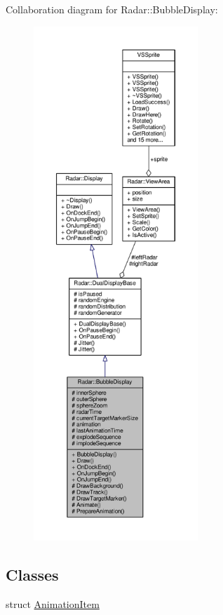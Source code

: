 Collaboration diagram for Radar\+:\+:Bubble\+Display\+:
\nopagebreak
\begin{figure}[H]
\begin{center}
\leavevmode
\includegraphics[height=550pt]{d6/d5b/classRadar_1_1BubbleDisplay__coll__graph}
\end{center}
\end{figure}
\subsection*{Classes}
\begin{DoxyCompactItemize}
\item 
struct \hyperlink{structRadar_1_1BubbleDisplay_1_1AnimationItem}{Animation\+Item}
\end{DoxyCompactItemize}
